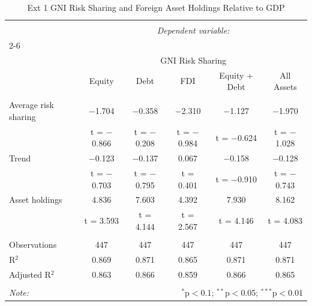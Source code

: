 
\begin{table}[!htbp] \centering 
  \caption{Ext 1 GNI Risk Sharing and Foreign Asset Holdings Relative to GDP} 
  \label{} 
\begin{tabular}{@{\extracolsep{5pt}}lccccc} 
\\[-1.8ex]\hline 
\hline \\[-1.8ex] 
 & \multicolumn{5}{c}{\textit{Dependent variable:}} \\ 
\cline{2-6} 
\\[-1.8ex] & \multicolumn{5}{c}{GNI Risk Sharing} \\ 
 & Equity & Debt & FDI & Equity + Debt & All Assets \\ 
\hline \\[-1.8ex] 
 Average risk sharing & $-$1.704 & $-$0.358 & $-$2.310 & $-$1.127 & $-$1.970 \\ 
  & t = $-$0.866 & t = $-$0.208 & t = $-$0.984 & t = $-$0.624 & t = $-$1.028 \\ 
  Trend & $-$0.123 & $-$0.137 & 0.067 & $-$0.158 & $-$0.128 \\ 
  & t = $-$0.703 & t = $-$0.795 & t = 0.401 & t = $-$0.910 & t = $-$0.743 \\ 
  Asset holdings & 4.836 & 7.603 & 4.392 & 7.930 & 8.162 \\ 
  & t = 3.593 & t = 4.144 & t = 2.567 & t = 4.146 & t = 4.083 \\ 
 \hline \\[-1.8ex] 
Observations & 447 & 447 & 447 & 447 & 447 \\ 
R$^{2}$ & 0.869 & 0.871 & 0.865 & 0.871 & 0.871 \\ 
Adjusted R$^{2}$ & 0.863 & 0.866 & 0.859 & 0.866 & 0.865 \\ 
\hline 
\hline \\[-1.8ex] 
\textit{Note:}  & \multicolumn{5}{r}{$^{*}$p$<$0.1; $^{**}$p$<$0.05; $^{***}$p$<$0.01} \\ 
\end{tabular} 
\end{table} 
